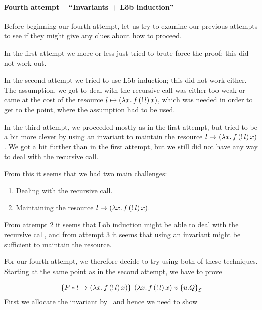\paragraph*{Fourth attempt -- ``Invariants + L{\"o}b induction''}
Before beginning our fourth attempt, let us try to examine our previous attempts to see if they might give any clues about how to proceed.

In the first attempt we more or less just tried to brute-force the proof; this did not work out. 

In the second attempt we tried to use L{\"o}b induction; this did not work either. The assumption, we got to deal with the recursive call was either too weak or came at the cost of the resource $l \mapsto \left(\lambda x.\, f \, (\mathop{!}{l})\, x\right)$, which was needed in order to get to the point, where the assumption had to be used.

In the third attempt, we proceeded mostly as in the first attempt, but tried to be a bit more clever by using an invariant to maintain the resource $l \mapsto \left(\lambda x.\, f \, (\mathop{!}{l})\, x\right)$. We got a bit further than in the first attempt, but we still did not have any way to deal with the recursive call.

From this it seems that we had two main challenges:
\begin{enumerate}
\item Dealing with the recursive call.
\item Maintaining the resource $l \mapsto \left(\lambda x.\, f \, (\mathop{!}{l})\, x\right)$.
\end{enumerate}
From attempt 2 it seems that L{\"o}b induction might be able to deal with the recursive call, and from attempt 3 it seems that using an invariant might be sufficient to maintain the resource. 

For our fourth attempt, we therefore decide to try using both of these techniques. Starting at the same point as in the second attempt, we have to prove

\begin{align*}
\hoare{P * l \pointsto \left(\lambda x.\, f \, (\deref{l})\, x  \right)}{\left(\lambda x.\, f \, (\deref{l})\, x  \right) \, v}{u.Q}[\mathcal{E}]
\end{align*}
First we allocate the invariant by~ and hence we need to show


